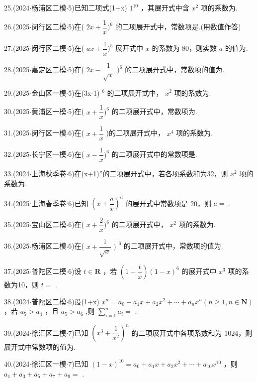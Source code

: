 25.(2024$\cdot$杨浦区二模$\cdot$5)已知二项式(1+x) ${1}^{10}$ ，其展开式中含 ${x}^{2}$ 项的系数为\blkda[2]{}.

26.(2025$\cdot$闵行区二模$\cdot$5)在( ${2x} + \dfrac{1}{x}{)}^{6}$ 的二项展开式中，常数项是\blkda[2]{}.(用数值作答)

27.(2025$\cdot$闵行区二模$\cdot$5)在( ${ax} + \dfrac{1}{x}{)}^{5}$ 展开式中 $x$ 的系数为 80，则实数 $a$ 的值为\blkda[2]{}.

28.(2025$\cdot$嘉定区二模$\cdot$5)在( ${2x} - \dfrac{1}{\sqrt{x}}$  ${)}^{6}$ 的二项展开式中，常数项的值为\blkda[2]{}.

29.(2025$\cdot$金山区一模$\cdot$5)在(3x-1) $^{6}$ 的二项展开式中， ${x}^{2}$ 项的系数为\blkda[2]{}.

30.(2025$\cdot$黄浦区一模$\cdot$5)在( $x + \dfrac{1}{x}{)}^{6}$ 的二项展开式中，常数项为\blkda[2]{}.

31.(2025$\cdot$闵行区一模$\cdot$6)在( $x + \dfrac{1}{x}$ )的二项展开式中， ${x}^{4}$ 项的系数为\blkda[2]{}.

32.(2025$\cdot$长宁区一模$\cdot$6)在( $x - \dfrac{1}{x}{)}^{6}$ 的二项展开式中的常数项是\blkda[2]{}.

33.(2024$\cdot$上海秋季卷$\cdot$6)在(x+1)”的二项展开式中，若各项系数和为32，则 ${x}^{2}$ 项的系数为\blkda[2]{}.

34.(2025$\cdot$上海春季卷$\cdot$6)已知 ${\left( x + \dfrac{a}{x}\right) }^{6}$ 的展开式中常数项是 20，则 $a =$ \blkda[2]{}.

35.(2025$\cdot$宝山区二模$\cdot$6)在( $x + \dfrac{2}{x}{)}^{6}$ 的二项展开式中， ${x}^{2}$ 项的系数为\blkda[2]{}.

36.(2025$\cdot$杨浦区二模$\cdot$6)在( $x + \dfrac{1}{\sqrt{x}}{\text{ ) }}^{6}$ 的二项展开式中，常数项的值为\blkda[2]{}.

37.(2025$\cdot$普陀区二模$\cdot$6)设 $t \in  \mathbf{R}$ ，若 $\left( {1 + \dfrac{t}{x}}\right) {\left( 1 - x\right) }^{6}$ 的展开式中 ${x}^{3}$ 项的系数为10，则 $t =$ \blkda[2]{}.

38.(2024$\cdot$普陀区二模$\cdot$6)设(1+x) ${x}^{n} = {a}_{0} + {a}_{1}x + {a}_{2}{x}^{2} + \cdots  + {a}_{n}{x}^{n}\left( {n \geq  1,n \in  \mathbf{N}}\right)$ ，若 ${a}_{5} > {a}_{4}$ ，且 ${a}_{5} > {a}_{6}$ ,则 $\mathop{\sum }\limits_{{i = 1}}^{n}{a}_{i} =$ \blkda[2]{}.

39.(2024$\cdot$徐汇区二模$\cdot$7)已知 ${\left( {x}^{3} + \dfrac{1}{{x}^{2}}\right) }^{n}$ 的二项展开式中各项系数和为 1024，则展开式中常数项的值为\blkda[2]{}.

40.(2024$\cdot$徐汇区一模$\cdot$7)已知 ${\left( 1 - x\right) }^{10} = {a}_{0} + {a}_{1}x + {a}_{2}{x}^{2} + \cdots  + {a}_{10}{x}^{10}$ ，则 ${a}_{1} + {a}_{3} + {a}_{5} + {a}_{7} + {a}_{9} =$ \blkda[2]{}.

